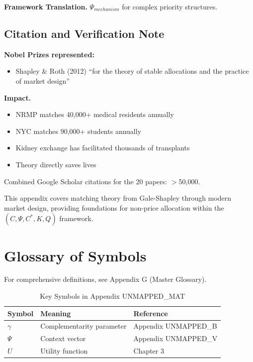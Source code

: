 \textbf{Framework Translation.}
$\Psi_{mechanism}$ for complex priority structures.

\subsection{Citation and Verification Note}

\textbf{Nobel Prizes represented:}
\begin{itemize}
    \item Shapley \& Roth (2012) ``for the theory of stable allocations and 
          the practice of market design''
\end{itemize}

\textbf{Impact.}
\begin{itemize}
    \item NRMP matches 40,000+ medical residents annually
    \item NYC matches 90,000+ students annually
    \item Kidney exchange has facilitated thousands of transplants
    \item Theory directly saves lives
\end{itemize}

Combined Google Scholar citations for the 20 papers: $>$50,000.

This appendix covers matching theory from Gale-Shapley through modern 
market design, providing foundations for non-price allocation within 
the $(C, \Psi, C^*, K, Q)$ framework.




\section{Glossary of Symbols}
\label{sec:mat-glossary}

For comprehensive definitions, see Appendix G (Master Glossary).

\begin{table}[htbp]
\centering
\caption{Key Symbols in Appendix UNMAPPED_MAT}
\begin{tabular}{lll}
\toprule
\textbf{Symbol} & \textbf{Meaning} & \textbf{Reference} \\
\midrule
$\gamma$ & Complementarity parameter & Appendix UNMAPPED_B \\
$\Psi$ & Context vector & Appendix UNMAPPED_V \\
$U$ & Utility function & Chapter 3 \\
\bottomrule
\end{tabular}
\end{table}



